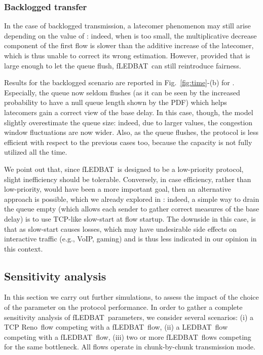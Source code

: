 \documentclass[conference]{IEEEtran}
\newcommand{\figR}[1]{Fig.~\ref{fig:#1}}
\newcommand{\reno}[0]{TCP Reno}
\newcommand{\btledbat}[0]{LEDBAT}
\newcommand{\fledbat}[0]{fLEDBAT}
\begin{document}
\subsubsection{Backlogged transfer}

In the case of backlogged transmission, a latecomer phenomenon may still arise depending on the value of : indeed, when  is too small, the multiplicative decrease component of the first flow is slower than the additive increase of the latecomer, which is thus unable to correct its wrong estimation.
However, provided that  is large enough to let the queue flush, \fledbat\ can still reintroduce fairness.

Results for the backlogged scenario are reported in \figR{time}-(b) for
. Especially, the queue now seldom flushes (as it can be seen by the
increased probability to have a null queue length shown by the PDF)  which helps
latecomers gain a correct view of the base delay. In this case, though, the
model slightly overestimate the queue size: indeed, due to larger 
values, the congestion window fluctuations are now wider. Also, as the queue
flushes, the protocol is less efficient with respect to the previous cases too,
because the capacity is not fully utilized all the time.

We point out that, since \fledbat\ is designed to be a low-priority protocol,
slight inefficiency should be tolerable. Conversely, in case efficiency, rather
than low-priority, would have been a more important goal, then an alternative
approach is possible, which we already explored in \cite{icccn10}: indeed, a
simple way to drain the queue empty (which allows each sender to gather correct
measures of the base delay) is to use TCP-like slow-start at flow startup. The
downside in this case, is that as slow-start causes losses, which may have
undesirable side effects on interactive traffic (e.g., VoIP, gaming) and is thus
less indicated in our opinion in this context.

\subsection{Sensitivity analysis}\label{sec:sensitivity}


In this section we carry out further simulations, to assess the impact of the
choice of the parameter  on the protocol performance.
In order to gather a complete sensitivity analysis of \fledbat\ parameters,
we consider several scenarios: (i) a \reno\ flow competing with a
\fledbat\ flow, (ii) a \btledbat\ flow competing with a \fledbat\ flow, (iii) two or more \fledbat\ flows competing for the same bottleneck. All flows operate in chunk-by-chunk transmission mode.
\end{document}

